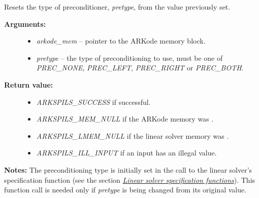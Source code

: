 \documentclass[letterpaper,10pt,english]{sphinxmanual}
\begin{document}

\begin{fulllineitems}
\label{c_interface/User_callable:ARKSpilsSetPrecType}
Resets the type of preconditioner, \emph{pretype}, from the value previously set.
\begin{description}
\item[{\textbf{Arguments:}}] \leavevmode\begin{itemize}
\item {} 
\emph{arkode\_mem} -- pointer to the ARKode memory block.

\item {} 
\emph{pretype} -- the type of preconditioning to use, must be one of
\emph{PREC\_NONE}, \emph{PREC\_LEFT}, \emph{PREC\_RIGHT} or \emph{PREC\_BOTH}.

\end{itemize}

\item[{\textbf{Return value:}}] \leavevmode\begin{itemize}
\item {} 
\emph{ARKSPILS\_SUCCESS} if successful.

\item {} 
\emph{ARKSPILS\_MEM\_NULL} if the ARKode memory was .

\item {} 
\emph{ARKSPILS\_LMEM\_NULL} if the linear solver memory was .

\item {} 
\emph{ARKSPILS\_ILL\_INPUT} if an input has an illegal value.

\end{itemize}

\end{description}

\textbf{Notes:} The preconditioning type is initially set in the call to the
linear solver's specification function (see the section
{\hyperref[c_interface/User_callable:cinterface-linearsolvers]{\emph{Linear solver specification functions}}}).  This function call is needed
only if \emph{pretype} is being changed from its original value.

\end{fulllineitems}

\end{document}
